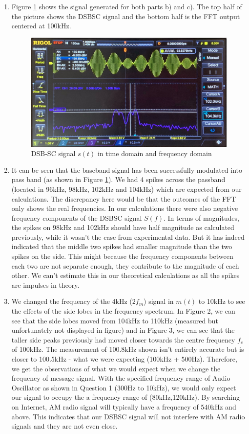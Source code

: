 \documentclass[11pt]{article}
\begin{document}
\begin{enumerate}[label=(\alph*)]
\item %
Figure \ref{fig:q2} shows the signal generated for both parts b) and c). The top half of the picture shows the DSBSC signal and the bottom half is the FFT output centered at 100kHz.
\begin{figure}[H]
    \centering
    \includegraphics[scale = 0.205]{Q2b.jpg}
    \caption{\label{fig:q2}DSB-SC signal $s(t)$ in time domain and frequency domain}
\end{figure}
\item %
It can be seen that the baseband signal has been successfully modulated into pass band (as shown in Figure \ref{fig:q2}). We had 4 spikes across the passband (located in 96kHz, 98kHz, 102kHz and 104kHz) which are expected from our calculations. The discrepancy here would be that the outcomes of the FFT only shows the real frequencies. In our calculations there were also negative frequency components of the DSBSC signal $S(f)$. In terms of magnitudes, the spikes on 98kHz and 102kHz should have half magnitude as calculated previously, while it wasn't the case from experimental data. But it has indeed indicated that the middle two spikes had smaller magnitude than the two spikes on the side. This might because the frequency components between each two are not separate enough, they contribute to the magnitude of each other. We can't estimate this in our theoretical calculations as all the spikes are impulses in theory.    
\item %
We changed the frequency of the 4kHz (2$f_m$) signal in $m(t)$ to 10kHz to see the effects of the side lobes in the frequency spectrum. In Figure 2, we can see that the side lobes moved from 104kHz to 110kHz (measured but unfortunately not displayed in figure) and in Figure 3, we can see that the taller side peaks previously had moved closer towards the centre frequency $f_c$ of 100kHz. The measurement of 100.8kHz shown isn't entirely accurate but is closer to 100.5kHz - what we were expecting (100kHz + 500Hz). Therefore, we get the observations of what we would expect when we change the frequency of message signal. With the specified frequency range of Audio Oscillator as shown in Question 1 (300Hz to 10kHz), we would only expect our signal to occupy the a frequency range of (80kHz,120kHz). By searching on Internet, AM radio signal will typically have a frequency of 540kHz and above. This indicates that our DSBSC signal will not interfere with AM radio signals and they are not even close.

\end{enumerate}
\end{document}
